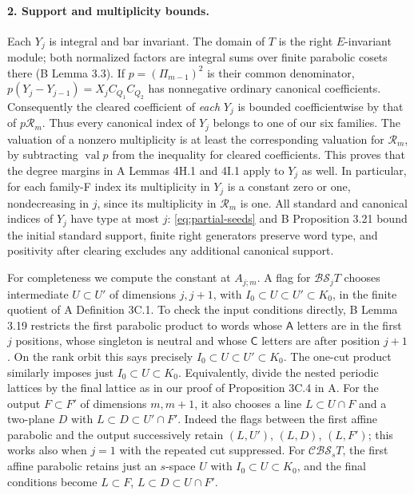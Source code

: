 \paragraph{2. Support and multiplicity bounds.}
Each \(Y_j\) is integral and bar invariant. The domain of \(T\) is the right \(E\)-invariant module; both normalized factors are integral sums over finite parabolic cosets there (B Lemma 3.3). If \(p=(\Pi_{m-1})^2\) is their common denominator, \(p(Y_j-Y_{j-1})=X_j C_{Q_1} C_{Q_2}\) has nonnegative ordinary canonical coefficients. Consequently the cleared coefficient of \emph{each} \(Y_j\) is bounded coefficientwise by that of \(p\mathcal R_m\). Thus every canonical index of \(Y_j\) belongs to one of our six families. The valuation of a nonzero multiplicity is at least the corresponding valuation for \(\mathcal R_m\), by subtracting \(\operatorname{val}p\) from the inequality for cleared coefficients. This proves that the degree margins in A Lemmas 4H.1 and 4I.1 apply to \(Y_j\) as well. In particular, for each family-F index its multiplicity in \(Y_j\) is a constant zero or one, nondecreasing in \(j\), since its multiplicity in \(\mathcal R_m\) is one. All standard and canonical indices of \(Y_j\) have type at most \(j\): \eqref{eq:partial-seeds} and B Proposition 3.21 bound the initial standard support, finite right generators preserve word type, and positivity after clearing excludes any additional canonical support.

For completeness we compute the constant at \(A_{j;m}\). A flag for \(\mathcal{BS}_jT\) chooses intermediate \(U\subset U'\) of dimensions \(j,j+1\), with \(I_0\subset U\subset U'\subset K_0\), in the finite quotient of A Definition 3C.1. To check the input conditions directly, B Lemma 3.19 restricts the first parabolic product to words whose $\mathsf A$ letters are in the first \(j\) positions, whose singleton is neutral and whose $\mathsf C$ letters are after position \(j+1\). On the rank orbit this says precisely \(I_0\subset U\subset U'\subset K_0\). The one-cut product similarly imposes just \(I_0\subset U\subset K_0\). Equivalently, divide the nested periodic lattices by the final lattice as in our proof of Proposition 3C.4 in A. For the output \(F\subset F'\) of dimensions \(m,m+1\), it also chooses a line \(L\subset U\cap F\) and a two-plane \(D\) with \(L\subset D\subset U'\cap F'\). Indeed the flags between the first affine parabolic and the output successively retain \((L,U')\), \((L,D)\), \((L,F')\); this works also when \(j=1\) with the repeated cut suppressed. For \(\mathcal{CBS}_s T\), the first affine parabolic retains just an \(s\)-space \(U\) with \(I_0\subset U\subset K_0\), and the final conditions become \(L\subset F\), \(L\subset D\subset U\cap F'\).

